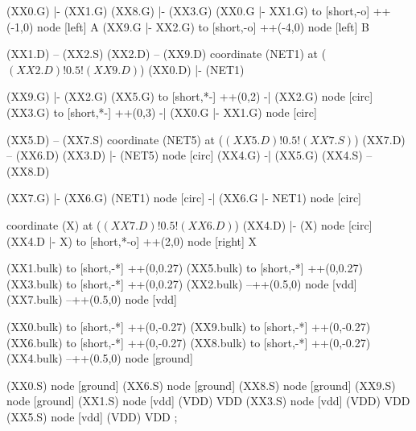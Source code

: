 \begin{circuitikz}[american]

	(XX0.G) |- (XX1.G)
	(XX8.G) |- (XX3.G)
	(XX0.G |- XX1.G) to [short,-o] ++(-1,0) node [left] {A}
	(XX9.G |- XX2.G) to [short,-o] ++(-4,0) node [left] {B}
	
	(XX1.D) -- (XX2.S)
	(XX2.D) -- (XX9.D)
	coordinate (NET1) at ($(XX2.D)!0.5!(XX9.D)$)
	(XX0.D) |- (NET1)
	
	(XX9.G) |- (XX2.G)
	(XX5.G) to [short,*-] ++(0,2)  -| (XX2.G) node [circ] {}
	(XX3.G) to [short,*-] ++(0,3) -| (XX0.G |- XX1.G) node [circ] {}
	
	(XX5.D) -- (XX7.S)
	coordinate (NET5) at ($(XX5.D)!0.5!(XX7.S)$)
	(XX7.D) -- (XX6.D) 
	(XX3.D) |- (NET5) node [circ] {}
	(XX4.G) -| (XX5.G)
	(XX4.S) -- (XX8.D)

	(XX7.G) |- (XX6.G)
	(NET1) node [circ] {} -| (XX6.G |- NET1) node [circ] {}
	
	coordinate (X) at ($(XX7.D)!0.5!(XX6.D)$)
	(XX4.D) |- (X) node [circ] {}
	(XX4.D |- X) to [short,*-o] ++(2,0) node [right] {X}
	
	(XX1.bulk) to [short,-*] ++(0,0.27)
	(XX5.bulk) to [short,-*] ++(0,0.27)
	(XX3.bulk) to [short,-*] ++(0,0.27)
	(XX2.bulk) --++(0.5,0) node [vdd] {}
	(XX7.bulk) --++(0.5,0) node [vdd] {}
		
	(XX0.bulk) to [short,-*] ++(0,-0.27)
	(XX9.bulk) to [short,-*] ++(0,-0.27)
	(XX6.bulk) to [short,-*] ++(0,-0.27)
	(XX8.bulk) to [short,-*] ++(0,-0.27)
	(XX4.bulk) --++(0.5,0) node [ground] {}
	

	(XX0.S) node [ground] {}
	(XX6.S) node [ground] {}
	(XX8.S) node [ground] {}
	(XX9.S) node [ground] {}
	(XX1.S) node [vdd] (VDD) {VDD}
	(XX3.S) node [vdd] (VDD) {VDD}
	(XX5.S) node [vdd] (VDD) {VDD}
;

\end{circuitikz}
